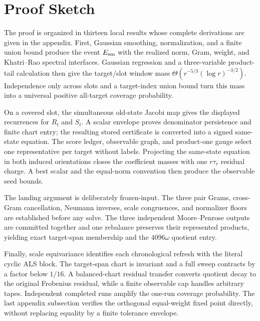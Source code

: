 \section{Proof Sketch}\label{sec:proof-sketch}

The proof is organized in thirteen local results whose complete derivations
are given in the appendix.  First, Gaussian smoothing, normalization, and a
finite union bound produce the event $E_{\rm sm}$ with the realized norm,
Gram, weight, and Khatri--Rao spectral interfaces.  Gaussian regression and a
three-variable product-tail calculation then give the target/slot window mass
$\Theta(r^{-5/3}(\log r)^{-3/2})$.  Independence only across slots and a
target-index union bound turn this mass into a universal positive
all-target coverage probability.

On a covered slot, the simultaneous old-state Jacobi map gives the displayed
recurrences for $R_t$ and $S_t$.  A scalar envelope proves denominator
persistence and finite chart entry; the resulting stored certificate is
converted into a signed same-state equation.  The score ledger, observable
graph, and product-one gauge select one representative per target without
labels.  Projecting the same-state equation in both induced orientations
closes the coefficient masses with one $r\tau_r$ residual charge.  A best
scalar and the equal-norm convention then produce the observable seed bounds.

The landing argument is deliberately frozen-input.  The three pair Grams,
cross-Gram cancellation, Neumann inverses, scale congruences, and normalizer
floors are established before any solve.  The three independent
Moore--Penrose outputs are committed together and one rebalance preserves
their represented products, yielding exact target-span membership and the
$4096\omega$ quotient entry.

Finally, scale equivariance identifies each chronological refresh with the
literal cyclic ALS block.  The target-span chart is invariant and a full
sweep contracts by a factor below $1/16$.  A balanced-chart residual transfer
converts quotient decay to the original Frobenius residual, while a finite
observable cap handles arbitrary tapes.  Independent completed runs amplify
the one-run coverage probability.  The last appendix subsection verifies the
orthogonal equal-weight fixed point directly, without replacing equality by a
finite tolerance envelope.
